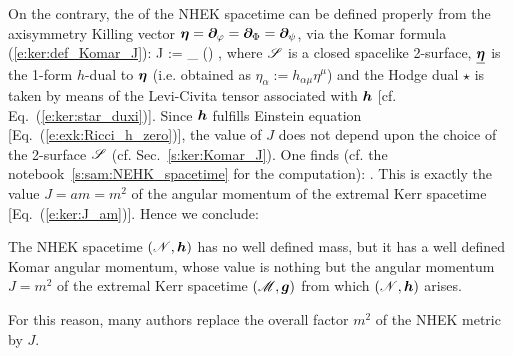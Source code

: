 On the contrary, the
 of the NHEK spacetime can be defined
properly from the axisymmetry Killing vector
$\bm{\eta} = \bm{\partial}_{\varphi} = \bm{\partial}_{\Phi} = \bm{\partial}_{\psi}$, via
the Komar formula (\ref{e:ker:def_Komar_J}):
\be
     J :=  \int_{\Sp} \star(\dd \uu{\eta})  ,
\ee
where $\mathscr{S}$ is a closed spacelike 2-surface, $\underline{\bm{\eta}}$ is the 1-form $h$-dual to $\bm{\eta}$ (i.e. obtained as $\eta_\alpha := h_{\alpha\mu} \eta^\mu$)
and the Hodge dual $\star$
is taken by means of the Levi-Civita tensor associated with $\bm{h}$ [cf. Eq.~(\ref{e:ker:star_duxi})].
Since $\bm{h}$ fulfills Einstein equation [Eq.~(\ref{e:exk:Ricci_h_zero})], the value
of $J$ does not depend upon the choice of the 2-surface $\mathscr{S}$ (cf. Sec.~\ref{s:ker:Komar_J}).
One finds (cf. the notebook~\ref{s:sam:NEHK_spacetime} for the computation):
\be
     .
\ee
This is exactly the value $J = a m = m^2$ of the angular momentum of the
extremal Kerr spacetime [Eq.~(\ref{e:ker:J_am})]. Hence we conclude:
\begin{greybox}
The NHEK spacetime $(\mathscr{N},\bm{h})$ has no well defined mass, but it has a well defined
Komar angular momentum, whose value is nothing but the angular momentum $J = m^2$
of the extremal Kerr spacetime $(\mathscr{M},\bm{g})$ from which $(\mathscr{N},\bm{h})$ arises.
\end{greybox}

\begin{remark}
For this reason, many authors replace the overall factor $m^2$ of the NHEK metric
by $J$.
\end{remark}


